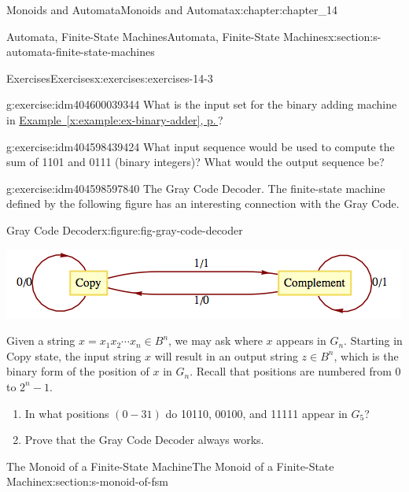 \documentclass[twoside,10pt,]{book}
\newcommand{\xreffont}{\relax}
\numberwithin{equation}{section}
\begin{document}
\begin{chapterptx}{Monoids and Automata}{}{Monoids and Automata}{}{}{x:chapter:chapter_14}
\begin{sectionptx}{Automata, Finite-State Machines}{}{Automata, Finite-State Machines}{}{}{x:section:s-automata-finite-state-machines}
\begin{exercises-subsection}{Exercises}{}{Exercises}{}{}{x:exercises:exercises-14-3}
\begin{divisionexercise}{3}{}{}{g:exercise:idm404600039344}
What is the input set for the binary adding machine in \hyperref[x:example:ex-binary-adder]{Example~{\xreffont\ref{x:example:ex-binary-adder}}, p.\,\pageref{x:example:ex-binary-adder}}?%
\end{divisionexercise}%
\begin{divisionexercise}{4}{}{}{g:exercise:idm404598439424}%
What input sequence would be used to compute the sum of 1101 and 0111 (binary integers)? What would the output sequence be?%
\end{divisionexercise}%
\begin{divisionexercise}{5}{}{}{g:exercise:idm404598597840}%
The Gray Code Decoder. The finite-state machine defined by the following figure has an interesting connection with the Gray Code.%
\begin{figureptx}{Gray Code Decoder}{x:figure:fig-gray-code-decoder}{}%
\begin{image}{0.15}{0.7}{0.15}%
\includegraphics[width=\linewidth]{images/fig-gray-code-decoder.png}
\end{image}%
\tcblower
\end{figureptx}%
Given a string \(x=x_1x_2\cdots  x_n\in B^n\), we may ask where \(x\) appears in \(G_n\). Starting in Copy state, the input string \(x\) will result in an output string \(z\in B^n\), which is the binary form of the position of \(x\) in \(G_n\).  Recall that positions are numbered from 0 to \(2^n-1\).%
\begin{enumerate}[label=(\alph*)]
\item{}In what positions \((0-31)\) do 10110, 00100, and 11111 appear in \(G_5\)?%
\item{}Prove that the Gray Code Decoder always works.%
\end{enumerate}
%
\end{divisionexercise}%
\end{exercises-subsection}
\end{sectionptx}
%
%
\typeout{************************************************}
\typeout{************************************************}
%
\begin{sectionptx}{The Monoid of a Finite-State Machine}{}{The Monoid of a Finite-State Machine}{}{}{x:section:s-monoid-of-fsm}

\end{sectionptx}
\end{chapterptx}
\end{document}
